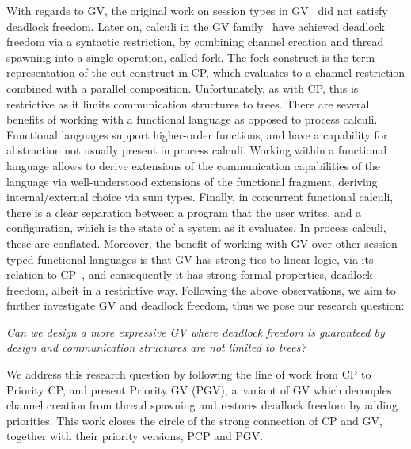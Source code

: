 \documentclass[main.tex]{subfiles}
\begin{document}
With regards to GV, the original work on session types in GV~\cite{gayvasconcelos10,gayvasconcelos12} did not satisfy deadlock freedom. Later on, calculi in the GV family~\cite{wadler15,lindleymorris15} have achieved deadlock freedom via a syntactic restriction, \ie by combining channel creation and thread spawning into a single operation, called fork. The fork construct is the term representation of the cut construct in CP, which evaluates to a channel restriction combined with a parallel composition. Unfortunately, as with CP, this is restrictive as it limits communication structures to trees. There are several benefits of working with a functional language as opposed to process calculi. Functional languages support higher-order functions, and have a capability for abstraction not usually present in process calculi. Working within a functional language allows to derive extensions of the communication capabilities of the language via well-understood extensions of the functional fragment, \ie deriving internal/external choice via sum types. Finally, in concurrent functional calculi, there is a clear separation between a program that the user writes, and a configuration, which is the state of a system as it evaluates. In process calculi, these are conflated.
Moreover, the benefit of working with GV over other session-typed functional languages is that GV has strong ties to linear logic, via its relation to CP~\cite{wadler12}, and consequently it has strong formal properties, \eg deadlock freedom, albeit in a restrictive way.
Following the above observations, we aim to further investigate GV and deadlock freedom, thus we pose our research question:

\emph{Can we design a more expressive GV where deadlock freedom is guaranteed by design and communication structures are not limited to trees?}

We address this research question by following the line of work from CP to Priority CP, and present
Priority GV (PGV), a~variant of GV which decouples channel creation from thread spawning and restores deadlock freedom by adding priorities. This work closes the circle of the strong connection of CP and GV, together with their priority versions, PCP and PGV.
\end{document}
